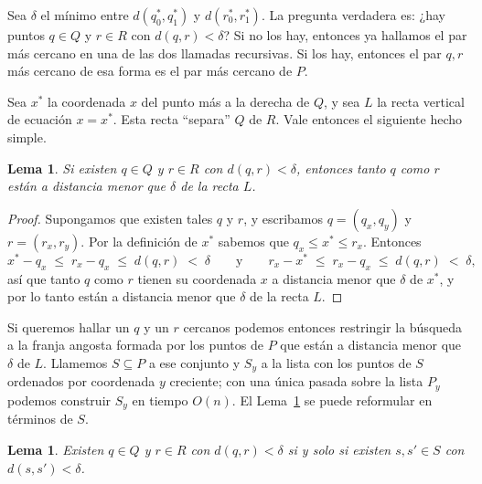 \documentclass[12pt, spanish, oneside, openany]{book}
\theoremstyle{uprightplain}
\newtheorem{lema}[teorema]{Lema}
\theoremstyle{definition}
\theoremstyle{remark}
\theoremstyle{definition}
\begin{document}
Sea $\delta$ el mínimo entre $d(q_0^*,q_1^*)$ y $d(r_0^*,r_1^*)$. La pregunta verdadera es: ¿hay puntos $q\in Q$ y $r\in R$ con $d(q,r)<\delta$? Si no los hay, entonces ya hallamos el par más cercano en una de las dos llamadas recursivas. Si los hay, entonces el par $q,r$ más cercano de esa forma es el par más cercano de $P$.

Sea $x^*$ la coordenada $x$ del punto más a la derecha de $Q$, y sea $L$ la recta vertical de ecuación $x=x^*$. Esta recta ``separa'' $Q$ de $R$. Vale entonces el siguiente hecho simple.

\begin{lema}
\label{lema:franja}
Si existen $q\in Q$ y $r\in R$ con $d(q,r)<\delta$, entonces tanto $q$ como $r$ están a distancia menor que $\delta$ de la recta $L$.
\end{lema}
\begin{proof}
Supongamos que existen tales $q$ y $r$, y escribamos $q=(q_x,q_y)$ y $r=(r_x,r_y)$. Por la definición de $x^*$ sabemos que $q_x\le x^*\le r_x$. Entonces
\[
x^*-q_x \;\le\; r_x-q_x \;\le\; d(q,r) \;<\;\delta
\qquad\text{y}\qquad
r_x-x^* \;\le\; r_x-q_x \;\le\; d(q,r) \;<\;\delta,
\]
así que tanto $q$ como $r$ tienen su coordenada $x$ a distancia menor que $\delta$ de $x^*$, y por lo tanto están a distancia menor que $\delta$ de la recta $L$.
\end{proof}

Si queremos hallar un $q$ y un $r$ cercanos podemos entonces restringir la búsqueda a la franja angosta formada por los puntos de $P$ que están a distancia menor que $\delta$ de $L$. Llamemos $S\subseteq P$ a ese conjunto y $S_y$ a la lista con los puntos de $S$ ordenados por coordenada $y$ creciente; con una única pasada sobre la lista $P_y$ podemos construir $S_y$ en tiempo $O(n)$. El Lema~\ref{lema:franja} se puede reformular en términos de $S$.

\begin{lema}
\label{lema:franja-equiv}
Existen $q\in Q$ y $r\in R$ con $d(q,r)<\delta$ si y solo si existen $s,s'\in S$ con $d(s,s')<\delta$.
\end{lema}
\end{document}
